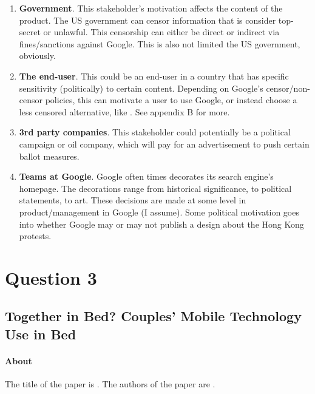 \begin{enumerate}
\item
  \textbf{Government}. This stakeholder's motivation affects the content of the product. The US government can censor information that is consider top-secret or unlawful. This censorship can either be direct or indirect via fines/sanctions against Google. This is also not limited the US government, obviously.
\item
  \textbf{The end-user}. This could be an end-user in a country that has specific sensitivity (politically) to certain content. Depending on Google's censor/non-censor policies, this can motivate a user to use Google, or instead choose a less censored alternative, like . See appendix B for more.
\item
  \textbf{3rd party companies}. This stakeholder could potentially be a political campaign or oil company, which will pay for an advertisement to push certain ballot measures.
\item
  \textbf{Teams at Google}. Google often times decorates its search engine's homepage. The decorations range from historical significance, to political statements, to art. These decisions are made at some level in product/management in Google (I assume). Some political motivation goes into whether Google may or may not publish a design about the Hong Kong protests.
\end{enumerate}

\section{Question 3}

\subsection{Together in Bed? Couples’ Mobile Technology Use in Bed}

\paragraph{About}
The title of the paper is . The authors of the paper are .

